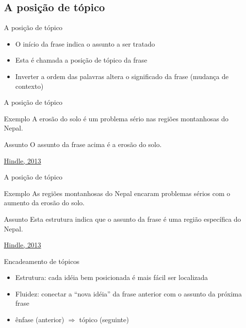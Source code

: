 \documentclass{beamer}
\begin{document}
\subsection{A posição de tópico}

\begin{frame}{A posição de tópico}
  \begin{itemize}
    \footnotesize
  \item O início da frase indica o assunto a ser tratado
    \medskip
  \item Esta é chamada a \alert{posição de tópico} da frase
    \medskip
  \item Inverter a ordem das palavras altera o significado da frase
    (mudança de contexto)
  \end{itemize}
\end{frame}

\begin{frame}{A posição de tópico}
  \begin{exampleblock}{Exemplo}
    \footnotesize
    A \alert<2->{erosão do solo} é um problema sério nas regiões
    montanhosas do Nepal.
  \end{exampleblock}
  \begin{block}{Assunto}
    \footnotesize
    O assunto da frase acima é a \alert<2->{erosão do solo}.
  \end{block}

  \vfill
  \scriptsize
  \hfill \href{https://web.archive.org/web/20150512123007/http://www.edanzediting.com/blog/reader_expectations_topic_position}
  {Hindle, 2013}
\end{frame}

\begin{frame}{A posição de tópico}
  \begin{exampleblock}{Exemplo}
    \footnotesize
    As \alert<2->{regiões montanhosas do Nepal} encaram problemas sérios com o
    aumento da erosão do solo.
  \end{exampleblock}
  \begin{block}{Assunto}
    \footnotesize
    Esta estrutura indica que o assunto da frase é \alert<2->{uma
      região específica} do Nepal.
  \end{block}

  \vfill
  \scriptsize
  \hfill \href{https://web.archive.org/web/20150512123007/http://www.edanzediting.com/blog/reader_expectations_topic_position}
  {Hindle, 2013}
\end{frame}

\begin{frame}{Encadeamento de tópicos}
  \begin{itemize}
    \footnotesize
  \item Estrutura: cada idéia bem posicionada é mais fácil ser
    localizada
  \item Fluidez: conectar a ``nova idéia'' da frase anterior com o
    assunto da próxima frase
  \item ênfase (anterior) $\Rightarrow$ tópico (seguinte)
  \end{itemize}
\end{frame}
\end{document}
